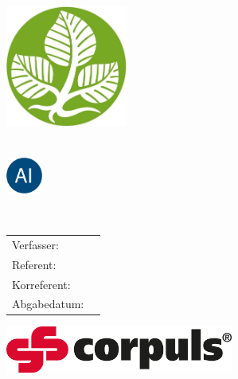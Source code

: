 \begin{titlepage}
  \centering

  \vspace{30mm}
  \includegraphics[width=40mm]{logos/hs-small}  

  \vspace{5mm}
  {\huge\MakeUppercase{\getUniversity{}}}\\
  
  \vspace{5mm}
  \includegraphics[width=12mm]{logos/ai}
  
  {\large\MakeUppercase{\getFaculty{}}}\\
  

  \vspace{15mm}
  {\Large \getDoctype{}}

  \vspace{10mm}
  {\huge\bfseries \getTitle{}}

  \vspace{30mm}
  \begin{tabular}{l l}
    Verfasser: & \getAuthor{} \\
    Referent: & \getSupervisor{} \\
    Korreferent: & \getAdvisor{} \\
    Abgabedatum: & \getSubmissionDate{} \\
  \end{tabular}

  \vspace{10mm}
  \includegraphics[width=75mm]{logos/gs}
\end{titlepage}
